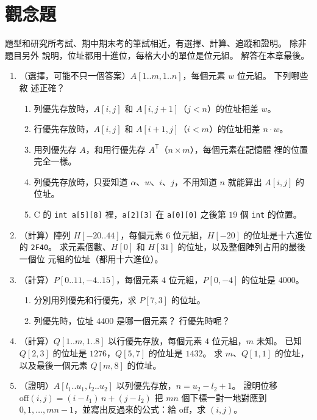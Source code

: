 \section{觀念題}
\label{sec:arr-exercises}

題型和研究所考試、期中期末考的筆試相近，有選擇、計算、追蹤和證明。 除非題目另外
說明，位址都用十進位，每格大小的單位是位元組。 解答在本章最後。

\begin{enumerate}
\item （選擇，可能不只一個答案）$A[1..m, 1..n]$，每個元素 $w$ 位元組。 下列哪些敘
述正確？
\begin{enumerate}
\item 列優先存放時，$A[i, j]$ 和 $A[i, j + 1]$（$j < n$）的位址相差 $w$。
\item 行優先存放時，$A[i, j]$ 和 $A[i + 1, j]$（$i < m$）的位址相差 $n \cdot w$。
\item 用列優先存 $A$，和用行優先存 $A^{\mathsf T}$（$n \times m$），每個元素在記憶體
裡的位置完全一樣。
\item 列優先存放時，只要知道 $\alpha$、$w$、$i$、$j$，不用知道 $n$ 就能算出
$A[i, j]$ 的位址。
\item C 的 \texttt{int a[5][8]} 裡，\texttt{a[2][3]} 在 \texttt{a[0][0]} 之後第 $19$
個 \texttt{int} 的位置。
\end{enumerate}

\item （計算）陣列 $H[-20..44]$，每個元素 $6$ 位元組，$H[-20]$ 的位址是十六進位的
\texttt{2F40}。 求元素個數、$H[0]$ 和 $H[31]$ 的位址，以及整個陣列占用的最後一個位
元組的位址（都用十六進位）。

\item （計算）$P[0..11, -4..15]$，每個元素 $4$ 位元組，$P[0, -4]$ 的位址是 $4000$。
\begin{enumerate}
\item 分別用列優先和行優先，求 $P[7, 3]$ 的位址。
\item 列優先時，位址 $4400$ 是哪一個元素？ 行優先時呢？
\end{enumerate}

\item （計算）$Q[1..m, 1..8]$ 以行優先存放，每個元素 $4$ 位元組，$m$ 未知。 已知
$Q[2, 3]$ 的位址是 $1276$，$Q[5, 7]$ 的位址是 $1432$。 求 $m$、$Q[1, 1]$ 的位址，
以及最後一個元素 $Q[m, 8]$ 的位址。

\item （證明）$A[l_1..u_1, l_2..u_2]$ 以列優先存放，$n = u_2 - l_2 + 1$。 證明位移
$\mathrm{off}(i, j) = (i - l_1)\,n + (j - l_2)$ 把 $mn$ 個下標一對一地對應到
$0, 1, \ldots, mn - 1$，並寫出反過來的公式：給 $\mathrm{off}$，求 $(i, j)$。


\end{enumerate}
